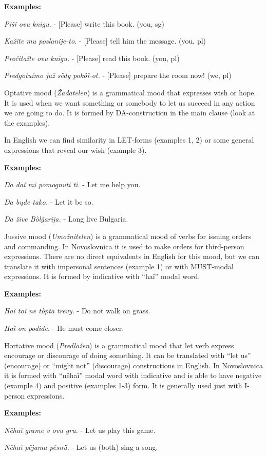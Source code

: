 \textbf{Examples:}

\textit{Piši ovu knigu.} - [Please] write this book. (you, sg)

\textit{Kažite mu poslanije-to.} - [Please] tell him the message. (you, pl)

\textit{Pročitaǐte ovu knigu.} - [Please] read this book. (you, pl)

\textit{Predgotuǐmo juž sëdy pokôǐ-ot.} - [Please] prepare the room now! (we, pl)

Optative mood (\textit{Žadatelen}) is a grammatical mood that expresses wish or hope. It is used when we want something or somebody to let us succeed in any action we are going to do. It is formed by DA-construction in the main clause (look at the examples). 

In English we can find similarity in LET-forms (examples 1, 2) or some general expressions that reveal our wish (example 3).

\textbf{Examples:}

\textit{Da daǐ mi pomognuti ti.} - Let me help you.

\textit{Da bųde tako.} - Let it be so.

\textit{Da žive Bòlĝarija.} - Long live Bulgaria.

Jussive mood (\textit{Umožnitelen}) is a grammatical mood of verbs for issuing orders and commanding. In Novoslovnica it is used to make orders for third-person expressions. There are no direct equivalents in English for this mood, but we can translate it with impersonal sentences (example 1) or with MUST-modal expressions. It is formed by indicative with “haǐ” modal word.

\textbf{Examples:}

\textit{Haǐ toǐ ne tòpta trevy.} - Do not walk on grass.

\textit{Haǐ on podide.} - He must come closer.

Hortative mood (\textit{Predložen})  is a grammatical mood that let verb express encourage or discourage of doing something. It can be translated with “let us” (encourage) or “might not” (discourage) constructions in English. In Novoslovnica it is formed with “něhaǐ” modal word with indicative and is able to have negative (example 4) and positive (examples 1-3) form. It is generally used just with I-person expressions.

\textbf{Examples:}

\textit{Něhaǐ grame v ovu gru.} - Let us play this game.

\textit{Něhaǐ pějama pěsnü.} - Let us (both) sing a song.


